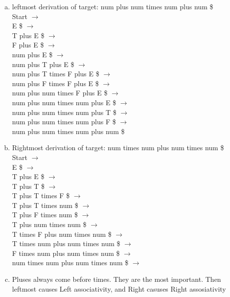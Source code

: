 \documentclass[11pt]{article}
\begin{document}
    \begin{enumerate}[(a)]
        \item leftmost derivation of target: num plus num times num plus num \$ \\
            Start $\to$ \\
            E \$ $\to$ \\
            T plus E \$ $\to$ \\
            F plus E \$ $\to$ \\
            num plus E \$ $\to$ \\
            num plus T plus E \$ $\to$ \\
            num plus T times F plus E \$ $\to$ \\
            num plus F times F plus E \$ $\to$ \\
            num plus num times F plus E \$ $\to$ \\
            num plus num times num plus E \$ $\to$ \\
            num plus num times num plus T \$ $\to$ \\
            num plus num times num plus F \$ $\to$ \\
            num plus num times num plus num \$
        \item Rightmost derivation of target: num times num plus num times num \$ \\
            Start $\to$ \\
            E \$ $\to$ \\
            T plus E \$ $\to$ \\
            T plus T \$ $\to$ \\
            T plus T times F \$ $\to$ \\
            T plus T times num \$ $\to$ \\
            T plus F times num \$ $\to$ \\
            T plus num times num \$ $\to$ \\
            T times F plus num times num \$ $\to$ \\
            T times num plus num times num \$ $\to$ \\
            F times num plus num times num \$ $\to$ \\
            num times num plus num times num \$ $\to$
        \item Pluses always come before times. They are the most important. Then leftmost causes Left associativity, and Right casuses Right assosiativity
    \end{enumerate}
\end{document}
